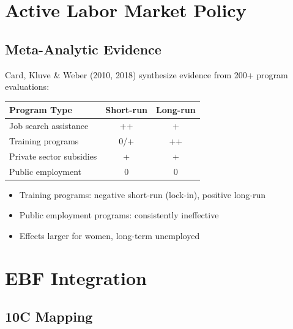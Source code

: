 \section{Active Labor Market Policy}

\subsection{Meta-Analytic Evidence}

Card, Kluve \& Weber (2010, 2018) synthesize evidence from 200+ program evaluations:

\begin{tcolorbox}[colback=blue!5!white, colframe=blue!75!black, title=What Works in Labor Market Policy?]
\begin{tabular}{lcc}
\textbf{Program Type} & \textbf{Short-run} & \textbf{Long-run} \\
\hline
Job search assistance & ++ & + \\
Training programs & 0/+ & ++ \\
Private sector subsidies & + & + \\
Public employment & 0 & 0 \\
\end{tabular}
\begin{itemize}
    \item Training programs: negative short-run (lock-in), positive long-run
    \item Public employment programs: consistently ineffective
    \item Effects larger for women, long-term unemployed
\end{itemize}
\end{tcolorbox}

\section{EBF Integration}

\subsection{10C Mapping}

